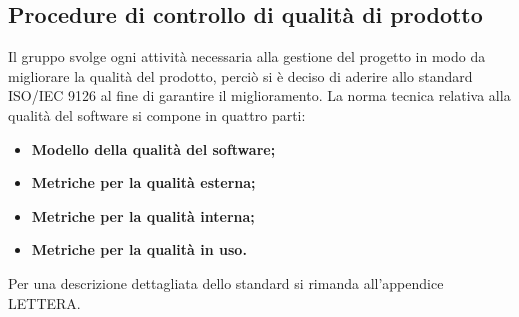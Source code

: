 \subsection{Procedure di controllo di qualità di prodotto}
Il gruppo svolge ogni attività necessaria alla gestione del progetto in modo da migliorare la qualità del prodotto, perciò si è deciso di aderire allo standard ISO/IEC 9126 al fine di garantire il miglioramento. La norma tecnica relativa alla qualità del software si compone in quattro parti:
\begin{itemize}
	\item \textbf{Modello della qualità del software;}
	\item \textbf{Metriche per la qualità esterna;}
	\item \textbf{Metriche per la qualità interna;}
	\item \textbf{Metriche per la qualità in uso.}
\end{itemize}
Per una descrizione dettagliata dello standard si rimanda all'appendice LETTERA.